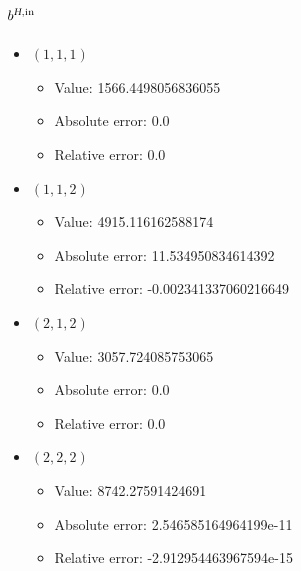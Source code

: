 \documentclass{article}%
\begin{document}
\subsection{$b^{\textsl{H},\text{in}}$}%
\begin{itemize}%
	\item $(1, 1, 1)$%
	\begin{itemize}%
		\item Value: 1566.4498056836055%
		\item Absolute error: 0.0%
		\item Relative error: 0.0%
	\end{itemize}%
	\item $(1, 1, 2)$%
	\begin{itemize}%
		\item Value: 4915.116162588174%
		\item Absolute error: 11.534950834614392%
		\item Relative error: -0.002341337060216649%
	\end{itemize}%
	\item $(2, 1, 2)$%
	\begin{itemize}%
		\item Value: 3057.724085753065%
		\item Absolute error: 0.0%
		\item Relative error: 0.0%
	\end{itemize}%
	\item $(2, 2, 2)$%
	\begin{itemize}%
		\item Value: 8742.27591424691%
		\item Absolute error: 2.546585164964199e-11%
		\item Relative error: -2.912954463967594e-15%
	\end{itemize}%
\end{itemize}%
\end{document}
